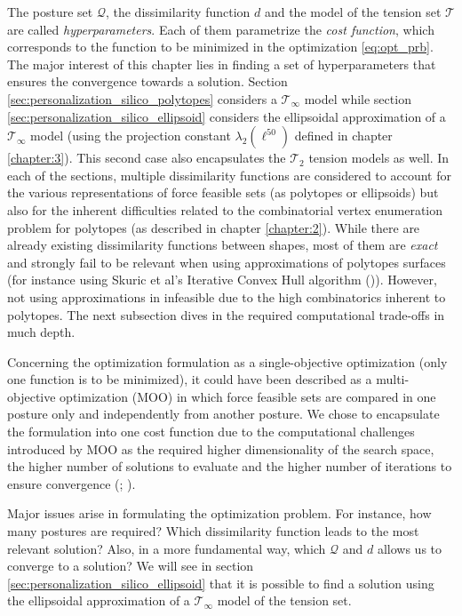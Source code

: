The posture set $\mathcal{Q}$, the dissimilarity function $d$ and the model of the tension set $\mathcal{T}$ are called \emph{hyperparameters}. Each of them parametrize the \emph{cost function}, which corresponds to the function to be minimized in the optimization \ref{eq:opt_prb}. The major interest of this chapter lies in finding a set of hyperparameters that ensures the convergence towards a solution. Section \ref{sec:personalization_silico_polytopes} considers a $\mathcal{T}_{\infty}$ model while section \ref{sec:personalization_silico_ellipsoid} considers the ellipsoidal approximation of a $\mathcal{T}_{\infty}$ model (using the projection constant $\lambda_2(\ell^{50})$ defined in chapter \ref{chapter:3}). This second case also encapsulates the $\mathcal{T}_2$ tension models as well. In each of the sections, multiple dissimilarity functions are considered to account for the various representations of force feasible sets (as polytopes or ellipsoids) but also for the inherent difficulties related to the combinatorial vertex enumeration problem for polytopes (as described in chapter \ref{chapter:2}). While there are already existing dissimilarity functions between shapes, most of them are \emph{exact} and strongly fail to be relevant when using approximations of polytopes surfaces (for instance using Skuric et al's Iterative Convex Hull algorithm (\cite{skuricOnLineFeasibleWrench2022})). However, not using approximations in infeasible due to the high combinatorics inherent to polytopes. The next subsection dives in the required computational trade-offs in much depth.

Concerning the optimization formulation as a single-objective optimization (only one function is to be minimized), it could have been described as a multi-objective optimization (MOO) in which force feasible sets are compared in one posture only and independently from another posture. We chose to encapsulate the formulation into one cost function due to the computational challenges introduced by MOO as the required higher dimensionality of the search space, the higher number of solutions to evaluate and the higher number of iterations to ensure convergence (\cite{huaSurveyEvolutionaryAlgorithms2021}; \cite{okabeCriticalSurveyPerformance2003}).

Major issues arise in formulating the optimization problem. For instance, how many postures are required? Which dissimilarity function leads to the most relevant solution? Also, in a more fundamental way, which $\mathcal{Q}$ and $d$ allows us to converge to a solution? We will see in section \ref{sec:personalization_silico_ellipsoid} that it is possible to find a solution using the ellipsoidal approximation of a $\mathcal{T}_{\infty}$ model of the tension set.

